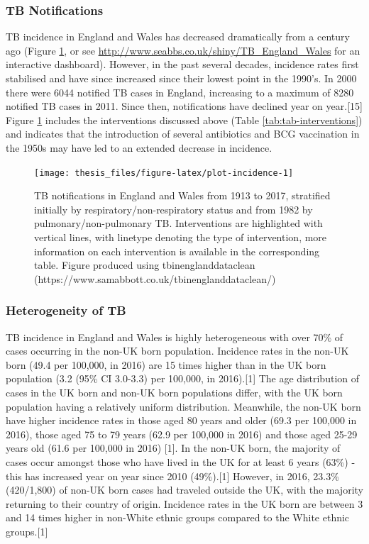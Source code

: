 \documentclass[11pt,twoside]{bristolthesis}
\begin{document}
  \hypertarget{tb-notifications}{%
  \subsubsection{TB Notifications}\label{tb-notifications}}
  
  TB incidence in England and Wales has decreased dramatically from a century ago (Figure \ref{fig:plot-incidence}, or see \url{http://www.seabbs.co.uk/shiny/TB_England_Wales} for an interactive dashboard). However, in the past several decades, incidence rates first stabilised and have since increased since their lowest point in the 1990's. In 2000 there were 6044 notified TB cases in England, increasing to a maximum of 8280 notified TB cases in 2011. Since then, notifications have declined year on year.{[}15{]} Figure \ref{fig:plot-incidence} includes the interventions discussed above (Table \ref{tab:tab-interventions}) and indicates that the introduction of several antibiotics and BCG vaccination in the 1950s may have led to an extended decrease in incidence.
  \begin{figure}
  
  {\centering \texttt{[image: thesis\_files/figure-latex/plot-incidence-1]} 
  
  }
  
  \caption{TB notifications in England and Wales from 1913 to 2017, stratified initially by respiratory/non-respiratory status and from 1982 by pulmonary/non-pulmonary TB. Interventions are highlighted with vertical lines, with linetype denoting the type of intervention, more information on each intervention is available in the corresponding table. Figure produced using tbinenglanddataclean (https://www.samabbott.co.uk/tbinenglanddataclean/)}\label{fig:plot-incidence}
  \end{figure}
  \hypertarget{heterogeneity-of-tb}{%
  \subsubsection{Heterogeneity of TB}\label{heterogeneity-of-tb}}
  
  TB incidence in England and Wales is highly heterogeneous with over 70\% of cases occurring in the non-UK born population. Incidence rates in the non-UK born (49.4 per 100,000, in 2016) are 15 times higher than in the UK born population (3.2 (95\% CI 3.0-3.3) per
  100,000, in 2016).{[}1{]} The age distribution of cases in the UK born and non-UK born populations differ, with the UK born population having a relatively uniform distribution. Meanwhile, the non-UK born have higher incidence rates in those aged 80 years and older (69.3 per 100,000 in 2016), those aged 75 to 79 years (62.9 per 100,000 in 2016) and those aged 25-29 years old (61.6 per 100,000 in 2016) {[}1{]}. In the non-UK born, the majority of cases occur amongst those who have lived in the UK for at least 6 years (63\%) - this has increased year on year since 2010 (49\%).{[}1{]} However, in 2016, 23.3\% (420/1,800) of non-UK born cases had traveled outside the UK, with the majority returning to their country of origin. Incidence rates in the UK born are between 3 and 14 times higher in non-White ethnic groups compared to the White ethnic groups.{[}1{]}
  
\end{document}
